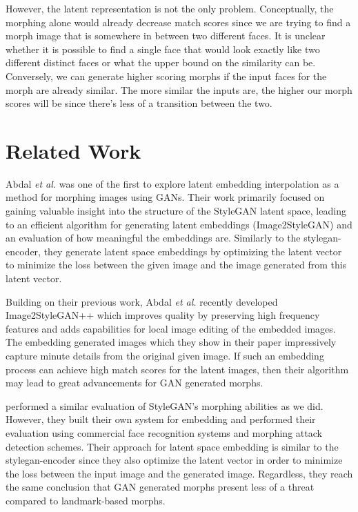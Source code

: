 \documentclass[12pt,twocolumn]{paper}
\begin{document}
\par
However, the latent representation is not the only problem. Conceptually, the morphing alone would already decrease match scores since we are trying to find a morph image that is somewhere in between two different faces. It is unclear whether it is possible to find a single face that would look exactly like two different distinct faces or what the upper bound on the similarity can be. Conversely, we can generate higher scoring morphs if the input faces for the morph are already similar. The more similar the inputs are, the higher our morph scores will be since there's less of a transition between the two.


\section{Related Work}
\par
Abdal \textit{et al.} \cite{abdal2019image2stylegan} was one of the first to explore latent embedding interpolation as a method for morphing images using GANs. Their work primarily focused on gaining valuable insight into the structure of the StyleGAN latent space, leading to an efficient algorithm for generating latent embeddings (Image2StyleGAN) and an evaluation of how meaningful the embeddings are. Similarly to the stylegan-encoder, they generate latent space embeddings by optimizing the latent vector to minimize the loss between the given image and the image generated from this latent vector.
\par
Building on their previous work, Abdal \textit{et al.} recently developed Image2StyleGAN++ \cite{abdal2020image2stylegan} which improves quality by preserving high frequency features and adds capabilities for local image editing of the embedded images. The embedding generated images which they show in their paper impressively capture minute details from the original given image. If such an embedding process can achieve high match scores for the latent images, then their algorithm may lead to great advancements for GAN generated morphs.
\par
\cite{venkatesh2020gan} performed a similar evaluation of StyleGAN's morphing abilities as we did. However, they built their own system for embedding and performed their evaluation using commercial face recognition systems and morphing attack detection schemes. Their approach for latent space embedding is similar to the stylegan-encoder since they also optimize the latent vector in order to minimize the loss between the input image and the generated image. Regardless, they reach the same conclusion that GAN generated morphs present less of a threat compared to landmark-based morphs.
\end{document}
